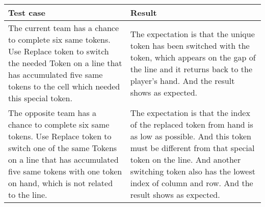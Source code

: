 \begin{table}[h]
	\centering
	\begin{tabular}{p{7cm}@{\hskip 5mm}  p{7cm}} 
		\toprule
		Test case   & Result   \\ 
		\midrule
		\midrule
    	The current team has a chance to complete six same tokens. Use Replace token to switch the needed Token on a line that has accumulated five same tokens to the cell which needed this special token.  & The expectation is that the unique token has been switched with the token, which appears on the gap of the line and it returns back to the player's hand. And the result shows as expected. \\
		\midrule
    	The opposite team has a chance to complete six same tokens. Use Replace token to switch one of the same Tokens on a line that has accumulated five same tokens with one token on hand, which is not related to the line. & The expectation is that the index of the replaced token from hand is as low as possible. And this token must be different from that special token on the line. And another switching token also has the lowest index of column and row.  And the result shows as expected.  \\
		\bottomrule
	\end{tabular}
\end{table}